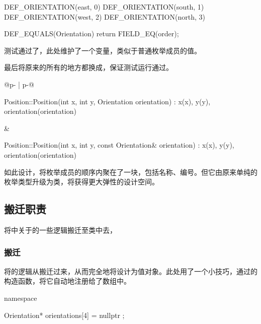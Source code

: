 \begin{content}
\begin{leftbar}
\begin{c++}[caption={src/robot-cleaner/Orientation.cpp}]
DEF_ORIENTATION(east,  0)
DEF_ORIENTATION(south, 1)
DEF_ORIENTATION(west,  2)
DEF_ORIENTATION(north, 3)

DEF_EQUALS(Orientation)
{
    return FIELD_EQ(order);
}
\end{c++}
\end{leftbar}

测试通过了，此处维护了一个变量，类似于普通枚举成员的值。

最后将原来的所有的地方都换成，保证测试运行通过。

\begin{tabular}{@{}p{} 
                 | p{}@{}}
\begin{c++}[caption={src/robot-cleaner/Position.cpp}]
Position::Position(int x, int y, Orientation orientation)
  : x(x), y(y), orientation(orientation)
{
}
\end{c++}
&
\begin{c++}[caption={src/robot-cleaner/Position.cpp}]
Position::Position(int x, int y, const Orientation& orientation)
  : x(x), y(y), orientation(orientation)
{
}
\end{c++}
\end{tabular}

如此设计，将枚举成员的顺序内聚在了一块，包括名称、编号。但它由原来单纯的枚举类型升级为类，将获得更大弹性的设计空间。

\subsection{搬迁职责}

将中关于的一些逻辑搬迁至类中去，

\subsubsection{搬迁}

将的逻辑从搬迁过来，从而完全地将设计为值对象。此处用了一个小技巧，通过的构造函数，将它自动地注册给了数组中。

\begin{leftbar}
\begin{c++}[caption={src/robot-cleaner/Orientation.cpp}]
namespace
{
    Orientation* orientations[4] = { nullptr };

}
\end{c++}
\end{leftbar}
\end{content}
